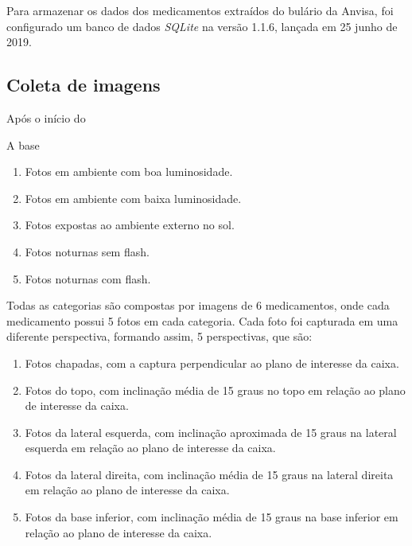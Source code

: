  Para armazenar os dados dos medicamentos extraídos do bulário da Anvisa, foi configurado um banco de dados \textit{SQLite} na versão 1.1.6, lançada em 25 junho de 2019. %

\subsection{Coleta de imagens}

Após o início do %

A base %

  \begin{enumerate}
   \item Fotos em ambiente com boa luminosidade.
   \item Fotos em ambiente com baixa luminosidade.
   \item Fotos expostas ao ambiente externo no sol.
   \item Fotos noturnas sem flash.
   \item Fotos noturnas com flash.
 \end{enumerate}
 


 Todas as categorias são compostas por imagens de 6 medicamentos, onde cada medicamento possui 5 fotos em cada categoria. Cada foto foi capturada em uma diferente perspectiva, formando assim, 5 perspectivas, que são:
   \begin{enumerate}
   \item Fotos chapadas, com a captura perpendicular ao plano de interesse da caixa.
   \item Fotos do topo, com inclinação média de 15 graus no topo em relação ao plano de interesse da caixa.
    \item Fotos da lateral esquerda, com inclinação aproximada de 15 graus na lateral esquerda em relação ao plano de interesse da caixa.
    \item Fotos da lateral direita, com inclinação média de 15 graus na lateral direita em relação ao plano de interesse da caixa.
    \item Fotos da base inferior, com inclinação média de 15 graus na base inferior em relação ao plano de interesse da caixa.
 \end{enumerate}
 
